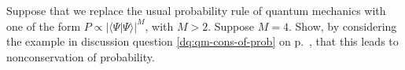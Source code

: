 Suppose that we replace the usual probability
rule of quantum mechanics with one of the form $P \propto |\langle\Psi|\Psi\rangle|^M$,
with $M>2$. Suppose $M=4$. Show, by considering the example in discussion question \ref{dq:qm-cons-of-prob} on p.~\pageref{dq:qm-cons-of-prob},
that this leads to nonconservation of probability.
